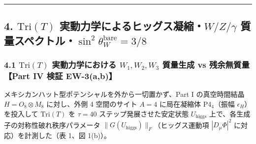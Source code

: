 \documentclass[
  a4paper,
]{ltjsarticle}
\begin{document}
\begin{center}\rule{0.5\linewidth}{0.5pt}\end{center}

\subsection{\texorpdfstring{4. \(\mathrm{Tri}(T)\)
実動力学によるヒッグス凝縮・\(W/Z/\gamma\)
質量スペクトル・\(\sin^2\theta_W^{\mathrm{bare}} = 3/8\)}{4. \textbackslash mathrm\{Tri\}(T) 実動力学によるヒッグス凝縮・W/Z/\textbackslash gamma 質量スペクトル・\textbackslash sin\^{}2\textbackslash theta\_W\^{}\{\textbackslash mathrm\{bare\}\} = 3/8}}\label{mathrmtrit-ux5b9fux52d5ux529bux5b66ux306bux3088ux308bux30d2ux30c3ux30b0ux30b9ux51ddux7e2ewzgamma-ux8ceaux91cfux30b9ux30daux30afux30c8ux30ebsin2theta_wmathrmbare-38}

\subsubsection{\texorpdfstring{4.1 \(\mathrm{Tri}(T)\) 実動力学における
\(W_1, W_2, W_3\) 質量生成 vs 残余無質量【Part IV 検証
EW-3(a,b)】}{4.1 \textbackslash mathrm\{Tri\}(T) 実動力学における W\_1, W\_2, W\_3 質量生成 vs 残余無質量【Part IV 検証 EW-3(a,b)】}}\label{mathrmtrit-ux5b9fux52d5ux529bux5b66ux306bux304aux3051ux308b-w_1-w_2-w_3-ux8ceaux91cfux751fux6210-vs-ux6b8bux4f59ux7121ux8ceaux91cfpart-iv-ux691cux8a3c-ew-3ab}

メキシカンハット型ポテンシャルを外から一切置かず、Part I の真空時間結晶
\(H = O_8 \otimes M_8\) に対し、外側 4 空間のサイト \(A = 4\)
に局在凝縮体 P4\(_4\)（振幅 \(\epsilon_H\)）を投入して
\(\mathrm{Tri}(T)\) を \(\tau = 40\) ステップ発展させた安定状態
\(U_{\mathrm{higgs}}\) 上で、各生成子の対称性破れ秩序パラメータ
\(\|G(U_{\mathrm{higgs}})\|_F\)（ヒッグス運動項 \(|D_\mu\Phi|^2\)
に対応）を計測した（表 1、図 1(b)）。
\end{document}
